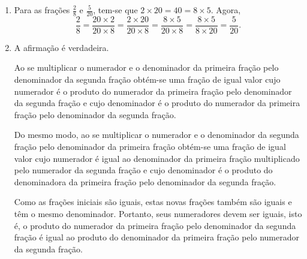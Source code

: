 \begin{multicols}{2}
\begin{orientacoes}{}{}



\end{orientacoes}{}{}
\clearpage
\end{multicols}

\begin{solucao}{}{}
\begin{enumerate} [\quad a)] %
    \item       Para as frações       $\frac{2}{8}$       e
$\frac{5}{20}$, tem-se que        $2 \times 20 = 40 = 8 \times 5$. Agora,
$$\frac{2}{8} = \frac{20 \times 2}{20 \times 8} = \frac{2 \times 20}{20 \times
8} = \frac{8 \times 5}{20 \times 8} = \frac{8 \times 5}{8 \times 20} =
\frac{5}{20}.$$
    \item       A afirmação é verdadeira.

  Ao se multiplicar o numerador e o denominador da primeira fração pelo
denominador da segunda fração obtém-se uma fração de igual valor cujo numerador
é o produto do numerador da primeira fração pelo denominador da segunda fração e
cujo denominador é o produto do numerador da primeira fração pelo denominador da
segunda fração.

  Do mesmo modo, ao se multiplicar o numerador e o denominador da segunda fração
pelo denominador da primeira fração obtém-se uma fração de igual valor cujo
numerador é igual ao denominador da primeira fração multiplicado pelo numerador
da segunda fração e cujo denominador é o produto do denominadora da primeira
fração pelo denominador da segunda fração.

  Como as frações iniciais são iguais, estas novas frações também são iguais e
têm o mesmo denominador. Portanto, seus numeradores devem ser iguais, isto é, o
produto do numerador da primeira fração pelo denominador da segunda fração é
igual ao produto do denominador da primeira fração pelo numerador da segunda
fração.
\end{enumerate} %

  \end{solucao}


